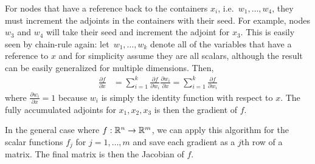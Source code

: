 For nodes that have a reference back to the containers $x_i$, i.e.\ $w_1,\ldots,w_4$,
they must increment the adjoints in the containers with their seed.
For example, nodes $w_3$ and $w_4$ will take their seed and increment the adjoint for $x_3$.
This is easily seen by chain-rule again: let~$w_1, \ldots, w_k$ denote all of the variables that have a 
reference to $x$ and for simplicity assume they are all scalars, 
although the result can be easily generalized for multiple dimensions.
Then,
\begin{align*}
    \frac{\partial f}{\partial x} 
    &=  \sum\limits_{i=1}^k
        \frac{\partial f}{\partial w_{i}} \frac{\partial w_{i}}{\partial x}
    =   \sum\limits_{i=1}^k
        \frac{\partial f}{\partial w_{i}}
\end{align*}
where $\frac{\partial w_i}{\partial x} = 1$ because $w_i$ is simply the identity function with respect to $x$.
The fully accumulated adjoints for $x_1, x_2, x_3$ is then the gradient of $f$.

In the general case where $f: \mathbb{R}^n \to \mathbb{R}^m$,
we can apply this algorithm for the scalar functions $f_j$ for $j = 1,\ldots,m$ and
save each gradient as a $j$th row of a matrix.
The final matrix is then the Jacobian of $f$.
